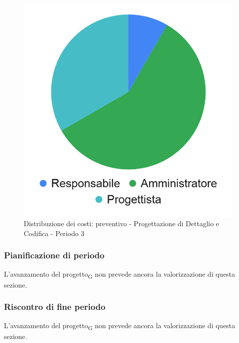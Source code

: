 \hspace{-1cm}
\begin{minipage}{.50\textwidth}
\smallPreventivoTable{
	
}
\end{minipage}
\hspace{1cm}
\begin{minipage}{.40\textwidth}
\begin{figure}[H]
	\includegraphics[scale=0.21]{res/images/charts/preventivo_priori/Grafico4-8.png}
	\caption{Distribuzione dei costi: preventivo - Progettazione di Dettaglio e Codifica - Periodo 3}
\end{figure}
\end{minipage} 



\subsubsection{Pianificazione di periodo}


L'avanzamento del progetto\textsubscript{G} non prevede ancora la valorizzazione di questa sezione.



\subsubsection{Riscontro di fine periodo}


L'avanzamento del progetto\textsubscript{G} non prevede ancora la valorizzazione di questa sezione.
